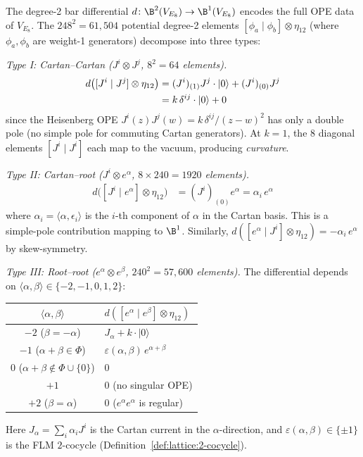 \begin{computation}
\label{comp:E8-bar-deg2}
The degree-2 bar differential $d\colon \B^2(V_{E_8}) \to \B^1(V_{E_8})$
encodes the full OPE data of $V_{E_8}$.  The $248^2 = 61{,}504$
potential degree-2 elements $[\phi_a \mid \phi_b] \otimes \eta_{12}$
(where $\phi_a, \phi_b$ are weight-1 generators) decompose into
three types:

\emph{Type I: Cartan--Cartan ($J^i \otimes J^j$, $8^2 = 64$ elements).}
\begin{align}
d\bigl([J^i \mid J^j] \otimes \eta_{12}\bigr)
&= (J^i)_{(1)}J^j \cdot |0\rangle + (J^i)_{(0)}J^j \notag \\
&= k\,\delta^{ij} \cdot |0\rangle + 0
\label{eq:E8-cartan-cartan}
\end{align}
since the Heisenberg OPE $J^i(z) J^j(w) = k\,\delta^{ij}/(z-w)^2$
has only a double pole (no simple pole for commuting Cartan generators).
At $k = 1$, the $8$ diagonal elements $[J^i \mid J^i]$ each
map to the vacuum, producing \emph{curvature}.

\emph{Type II: Cartan--root ($J^i \otimes e^\alpha$, $8 \times 240 = 1920$ elements).}
\begin{align}
d\bigl([J^i \mid e^\alpha] \otimes \eta_{12}\bigr)
&= (J^i)_{(0)}e^\alpha = \alpha_i \, e^\alpha
\label{eq:E8-cartan-root}
\end{align}
where $\alpha_i = \langle \alpha, \epsilon_i \rangle$ is the $i$-th
component of $\alpha$ in the Cartan basis.  This is a simple-pole
contribution mapping to $\B^1$.  Similarly,
$d([e^\alpha \mid J^i] \otimes \eta_{12}) = -\alpha_i\, e^\alpha$
by skew-symmetry.

\emph{Type III: Root--root ($e^\alpha \otimes e^\beta$,
$240^2 = 57{,}600$ elements).}
The differential depends on
$\langle \alpha, \beta \rangle \in \{-2, -1, 0, 1, 2\}$:
\begin{center}
\renewcommand{\arraystretch}{1.2}
\begin{tabular}{cl}
$\langle \alpha, \beta \rangle$ & $d([e^\alpha \mid e^\beta] \otimes \eta_{12})$ \\
\hline
$-2$ \;($\beta = -\alpha$) &
  $J_\alpha + k \cdot |0\rangle$ \\
$-1$ \;($\alpha + \beta \in \Phi$) &
  $\varepsilon(\alpha,\beta)\, e^{\alpha+\beta}$ \\
$0$ \;($\alpha + \beta \notin \Phi \cup \{0\}$) & $0$ \\
$+1$ & $0$ \;(no singular OPE) \\
$+2$ \;($\beta = \alpha$) & $0$ \;($e^\alpha e^\alpha$ is regular)
\end{tabular}
\end{center}
Here $J_\alpha = \sum_i \alpha_i J^i$ is the Cartan current
in the $\alpha$-direction, and $\varepsilon(\alpha,\beta) \in \{\pm 1\}$
is the FLM $2$-cocycle (Definition~\ref{def:lattice:2-cocycle}).


\end{computation}
